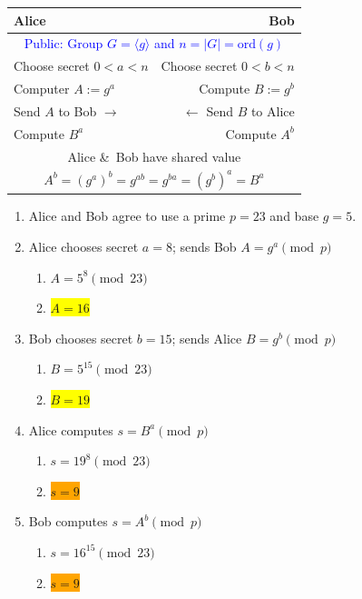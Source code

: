 \begin{frame}
\begin{tabular}{|lr|}\hline
Alice & Bob \\\hline
\multicolumn{2}{|c|}{\textcolor{blue}{Public: Group $G=\langle
g\rangle$ and $n=|G|=\text{ord}(g)$}} \\
Choose secret $0<a<n$             & Choose secret $0<b<n$ \\
Computer $A:=g^a$                 & Compute $B:=g^b$ \\
Send $A$ to Bob $\rightarrow$     & $\leftarrow$ Send $B$ to Alice \\
Compute $B^a$                     & Compute $A^b$ \\\hline
\multicolumn{2}{|c|}{Alice \&\ Bob have shared value} \\
\multicolumn{2}{|c|}{$A^b=(g^{a})^b=g^{ab}=g^{ba}=(g^b)^a=B^a$}
\\\hline
\end{tabular}
\end{frame}

\begin{frame}

\begin{enumerate}
\item  Alice and Bob agree to use a prime $p=23$ and base $g=5$.

\item  Alice chooses secret $a=8$; sends Bob $A=g^a \pmod p$
\begin{enumerate}
\item  $A = 5^8 \pmod{23}$
\item  \colorbox{yellow}{$A = 16$}
\end{enumerate}

\item  Bob chooses secret $b=15$; sends Alice $B = g^b \pmod p$
\begin{enumerate}
\item  $B = 5^{15} \pmod{23}$
\item  \colorbox{yellow}{$B = 19$}
\end{enumerate}

\item  Alice computes $s = B^a \pmod p$
\begin{enumerate}
\item  $s = 19^8 \pmod{23}$
\item  \colorbox{orange}{$s = 9$}
\end{enumerate}

\item Bob computes $s = A^b \pmod p$
\begin{enumerate}
\item  $s = 16^{15} \pmod{23}$
\item  \colorbox{orange}{$s = 9$}
\end{enumerate}
\end{enumerate}
\end{frame}

